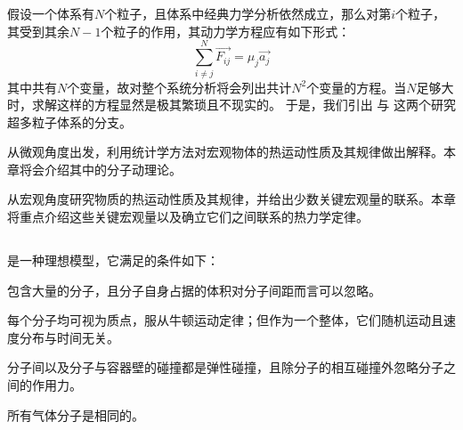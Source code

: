 \chapter[热力学]{}
    \section[导论]{}
        假设一个体系有$N$个粒子，且体系中经典力学分析依然成立，那么对第$i$个粒子，其受到其余$N-1$个粒子的作用，其动力学方程应有如下形式：
        \begin{equation*}
            \sum_{i\neq j}^N \vec{F_{ij}} = \mu_j \vec{a_j}
        \end{equation*}    
        其中共有$N$个变量，故对整个系统分析将会列出共计$N^2$个变量的方程。当$N$足够大时，求解这样的方程显然是极其繁琐且不现实的。
        于是，我们引出  与  这两个研究超多粒子体系的分支。

         从微观角度出发，利用统计学方法对宏观物体的热运动性质及其规律做出解释。本章将会介绍其中的分子动理论。

         从宏观角度研究物质的热运动性质及其规律，并给出少数关键宏观量的联系。本章将重点介绍这些关键宏观量以及确立它们之间联系的热力学定律。
    \section[理想气体]{}
         是一种理想模型，它满足的条件如下：
        
        \begin{Itemize}
            \item 包含大量的分子，且分子自身占据的体积对分子间距而言可以忽略。
            \item 每个分子均可视为质点，服从牛顿运动定律；但作为一个整体，它们随机运动且速度分布与时间无关。
            \item 分子间以及分子与容器壁的碰撞都是弹性碰撞，且除分子的相互碰撞外忽略分子之间的作用力。
            \item 所有气体分子是相同的。
        \end{Itemize}
        
